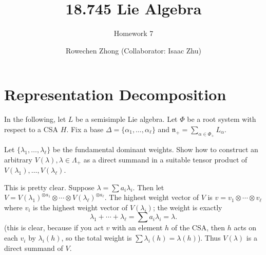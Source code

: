 \documentclass[11pt, headheight=30pt]{scrartcl}
\author{Rowechen Zhong (Collaborator: Isaac Zhu)}
\title{18.745 Lie Algebra}
\subtitle{Homework 7}
\begin{document}

\section{Representation Decomposition}

In the following, let $L$ be a semisimple Lie algebra. Let $\Phi$ be a root system with respect to a CSA $H$. Fix a base $\Delta = \{\alpha_1, \dots, \alpha_\ell\}$ and $\mathfrak{n}_+ = \sum_{\alpha \in \Phi_+} L_\alpha$.

\begin{prob*}
Let $\{\lambda_1, \dots, \lambda_\ell\}$ be the fundamental dominant weights. Show how to construct an arbitrary $V(\lambda), \lambda \in \Lambda_+$ as a direct summand in a suitable tensor product of $V(\lambda_1), \dots, V(\lambda_\ell)$.
\end{prob*}

This is pretty clear. Suppose $\lambda = \sum a_i \lambda_i$. Then let $V = V(\lambda_1)^{\otimes a_1} \otimes \cdots \otimes V(\lambda_\ell)^{\otimes a_\ell}$. The highest weight vector of $V$ is $v = v_1 \otimes \cdots \otimes v_\ell$ where $v_i$ is the highest weight vector of $V(\lambda_i)$; the weight is exactly
\[
    \lambda_1 + \cdots + \lambda_\ell = \sum a_i \lambda_i = \lambda.    
\]
(this is clear, because if you act $v$ with an element $h$ of the CSA, then $h$ acts on each $v_i$ by $\lambda_i(h)$, so the total weight is $\sum \lambda_i(h) = \lambda(h)$). Thus $V(\lambda)$ is a direct summand of $V$.

\end{document}

